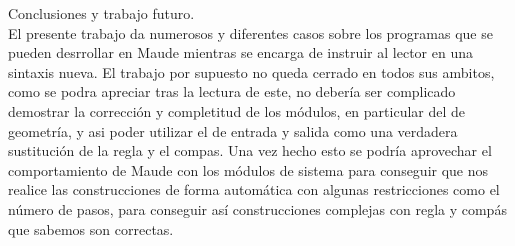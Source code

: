 Conclusiones y trabajo futuro.\\

El presente trabajo da numerosos y diferentes casos sobre los programas que se pueden desrrollar en Maude mientras se encarga de instruir al lector en una sintaxis nueva. El trabajo por supuesto no queda cerrado en todos sus ambitos, como se podra apreciar tras la lectura de este, no debería ser complicado demostrar la corrección y completitud de los módulos, en particular del de geometría, y asi poder utilizar el de entrada y salida como una verdadera sustitución de la regla y el compas. Una vez hecho esto se podría aprovechar el comportamiento de Maude con los módulos de sistema para conseguir que nos realice las construcciones de forma automática con algunas restricciones como el número de pasos, para conseguir así construcciones complejas con regla y compás que sabemos son correctas.\par
